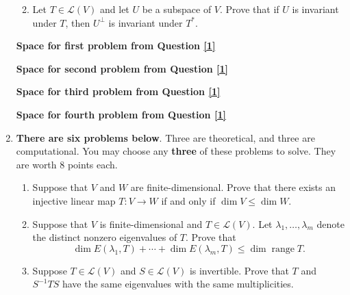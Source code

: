 \documentclass[12pt]{article}
\newcommand{\points}[1]{\marginpar{\hspace{24pt}[#1]}}
\DeclareMathOperator{\range}{range}
\renewcommand{\L}{\mathcal{L}}
\begin{document}
\begin{enumerate}
\begin{enumerate}
\vspace{1in}

 \item Let $T\in\L(V)$ and let $U$ be a subspace of $V$. Prove that if $U$ is invariant under $T$, then $U^\bot$ is invariant under $T^*$. \points{6}



\end{enumerate}
\newpage

\begin{center}
 {\bf Space for first problem from Question \ref{1}}
\end{center}

\newpage

\begin{center}
 {\bf Space for second problem from Question \ref{1}}
\end{center}

\newpage

\begin{center}
 {\bf Space for third problem from Question \ref{1}}
\end{center}

\newpage

\begin{center}
 {\bf Space for fourth problem from Question \ref{1}}
\end{center}

\newpage

\item {\bf There are six problems below}. Three are theoretical, and three are computational. You may choose any {\bf three} of these problems to solve. They are worth 8 points each.
\begin{enumerate}
\item Suppose that $V$ and $W$ are finite-dimensional. Prove that there exists an injective linear map $T:V\to W$ if and only if $\dim V\leq \dim W$. 

\bigskip

\item Suppose that $V$ is finite-dimensional and $T\in \L(V)$. Let $\lambda_1,\ldots, \lambda_m$ denote the distinct nonzero eigenvalues of $T$. Prove that
\[
 \dim E(\lambda_1,T)+\cdots +\dim E(\lambda_m,T)\leq \dim \range T.
\]


\bigskip

\item Suppose $T\in \L(V)$ and $S\in\L(V)$ is invertible. Prove that $T$ and $S^{-1}TS$ have the same eigenvalues with the same multiplicities.


\end{enumerate}
\end{enumerate}
\end{document}
